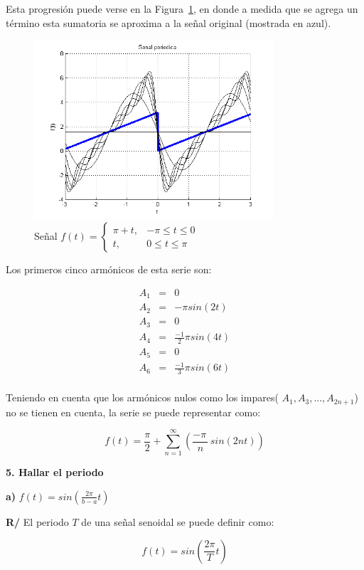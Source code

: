 \documentclass[twocolumn]{article}
\begin{document}
Esta progresión puede verse en la Figura~\ref{fig_1d}, en donde a medida que se agrega un término esta sumatoria se aproxima a la señal original (mostrada en azul).

\begin{figure}[!t]
\centering
\includegraphics[width=3.5in]{imgs/piece.png}
\caption{Señal $f(t) = \begin{cases}
\pi +t, &-\pi \leq t \leq 0\\
t, &0 \leq t \leq \pi \end{cases}$}
\label{fig_1d}
\end{figure}

Los primeros cinco armónicos de esta serie son:

\begin{eqnarray*}
A_1 &=& 0 \\
A_2 &=& -\pi sin(2t) \\
A_3 &=& 0 \\
A_4 &=& \frac{-1}{2}\pi sin(4t) \\
A_5 &=& 0 \\
A_6 &=& \frac{-1}{3}\pi sin(6t) \\
\end{eqnarray*}

Teniendo en cuenta que los armónicos nulos como los impares( $A_1 , A_3,..., A_{2n+1}$) no se tienen en cuenta, la serie se puede representar como:

$$f(t) = \frac{\pi}{2} + \sum_{n=1}^\infty\left( \frac{ -\pi \,}{n} \,sin(2 n t) \right)$$



\textbf{5. Hallar el periodo}

\textbf{a)} $f(t) = sin(\frac{2\pi}{b-a}t)$

\textbf{R/} El periodo $T$ de una señal senoidal se puede definir como:

$$f(t) = sin\left(\frac{2\pi}{T}t\right)$$
\end{document}
